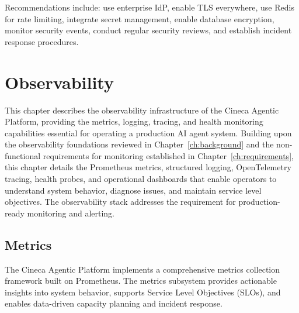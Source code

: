\documentclass[a4paper,twoside]{sapthesis}
\begin{document}
Recommendations include: use enterprise IdP, enable TLS everywhere, use Redis for rate limiting, integrate secret management, enable database encryption, monitor security events, conduct regular security reviews, and establish incident response procedures.



\chapter{Observability}
\label{ch:observability}


This chapter describes the observability infrastructure of the Cineca Agentic Platform, providing the metrics, logging, tracing, and health monitoring capabilities essential for operating a production AI agent system. Building upon the observability foundations reviewed in Chapter~\ref{ch:background} and the non-functional requirements for monitoring established in Chapter~\ref{ch:requirements}, this chapter details the Prometheus metrics, structured logging, OpenTelemetry tracing, health probes, and operational dashboards that enable operators to understand system behavior, diagnose issues, and maintain service level objectives. The observability stack addresses the requirement for production-ready monitoring and alerting.

\section{Metrics}
\label{sec:metrics}

The Cineca Agentic Platform implements a comprehensive metrics collection framework built on Prometheus. The metrics subsystem provides actionable insights into system behavior, supports Service Level Objectives (SLOs), and enables data-driven capacity planning and incident response.
\end{document}
